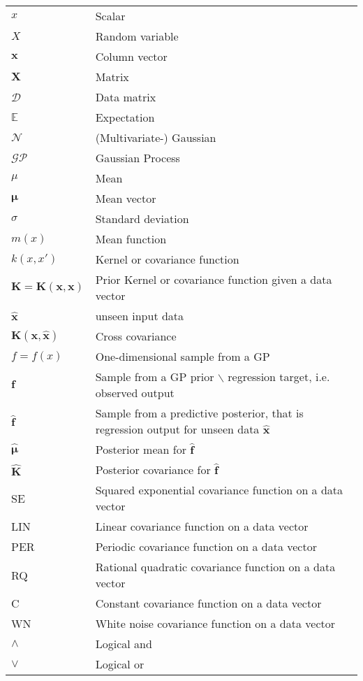 
\begin{tabular}{l l}
 $x$ 			& Scalar   \\
 $X$ 			& Random variable   \\
 $\mathbf{x}$		& Column vector    \\
 $\mathbf{X}$		& Matrix    \\
 $\mathcal{D}$		& Data matrix \\
 $\mathbb{E}$		& Expectation    \\
 $\mathcal{N}$		& (Multivariate-) Gaussian \\
 $\mathcal{GP}$		& Gaussian Process \\
 $\mu$                  & Mean \\
 $\bm{\mu}$             & Mean vector \\
 $\sigma$               & Standard deviation \\
 $m(x)$                 & Mean function \\
 $k(x,x')$              & Kernel or covariance function \\
 $\mathbf{K}=\mathbf{K}(\mathbf{x},\mathbf{x})$& Prior Kernel or covariance function given a data vector \\
 $\mathbf{\hat{x}}$     & unseen input data \\
 $\mathbf{K}(\mathbf{x},\mathbf{\hat{x}})$& Cross covariance \\
 $f = f(x)$             & One-dimensional sample from a GP \\
 $\mathbf{f}$           &  Sample from a GP prior $\backslash$ regression target, i.e. observed output \\
 $\mathbf{\hat{f}}$     &  Sample from a predictive posterior, that is regression output for unseen data $\mathbf{\hat{x}}$\\
 $\bm{\hat{\mu}}$       & Posterior mean for $\mathbf{\hat{f}}$ \\
 $\mathbf{\hat{K}}$     & Posterior covariance for $\mathbf{\hat{f}}$ \\
 SE	        & Squared exponential covariance function on a data vector \\
 LIN		        & Linear covariance function on a data vector \\
 PER		        & Periodic covariance function on a data vector \\
 RQ		        & Rational quadratic covariance function on a data vector \\
 C		        & Constant covariance function on a data vector \\
 WN		        & White noise covariance function on a data vector \\
 $\land$                & Logical and \\
 $\lor$                 & Logical or \\
\end{tabular}
